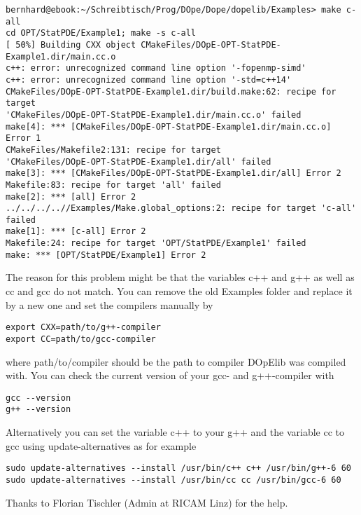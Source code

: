 \begin{lstlisting}
bernhard@ebook:~/Schreibtisch/Prog/DOpe/Dope/dopelib/Examples> make c-all
cd OPT/StatPDE/Example1; make -s c-all
[ 50%] Building CXX object CMakeFiles/DOpE-OPT-StatPDE-Example1.dir/main.cc.o
c++: error: unrecognized command line option '-fopenmp-simd'
c++: error: unrecognized command line option '-std=c++14'
CMakeFiles/DOpE-OPT-StatPDE-Example1.dir/build.make:62: recipe for target
'CMakeFiles/DOpE-OPT-StatPDE-Example1.dir/main.cc.o' failed
make[4]: *** [CMakeFiles/DOpE-OPT-StatPDE-Example1.dir/main.cc.o] Error 1
CMakeFiles/Makefile2:131: recipe for target
'CMakeFiles/DOpE-OPT-StatPDE-Example1.dir/all' failed
make[3]: *** [CMakeFiles/DOpE-OPT-StatPDE-Example1.dir/all] Error 2
Makefile:83: recipe for target 'all' failed
make[2]: *** [all] Error 2
../../../..//Examples/Make.global_options:2: recipe for target 'c-all' failed
make[1]: *** [c-all] Error 2
Makefile:24: recipe for target 'OPT/StatPDE/Example1' failed
make: *** [OPT/StatPDE/Example1] Error 2
\end{lstlisting}
The reason for this problem might be that the variables c++ and g++ as well as
cc and gcc do not match.
You can remove the old Examples folder and replace it by a new one and set the
compilers manually by
\begin{lstlisting}
export CXX=path/to/g++-compiler
export CC=path/to/gcc-compiler
\end{lstlisting}
where path/to/compiler should be the path to compiler DOpElib was compiled with.
You can check the current version of your gcc- and g++-compiler with
\begin{lstlisting}
gcc --version
g++ --version
\end{lstlisting}
Alternatively you can set the variable c++ to your g++ and the variable cc to
gcc using update-alternatives
as for example
\begin{lstlisting}
sudo update-alternatives --install /usr/bin/c++ c++ /usr/bin/g++-6 60
sudo update-alternatives --install /usr/bin/cc cc /usr/bin/gcc-6 60
\end{lstlisting}
Thanks to Florian Tischler (Admin at RICAM Linz) for the help.



